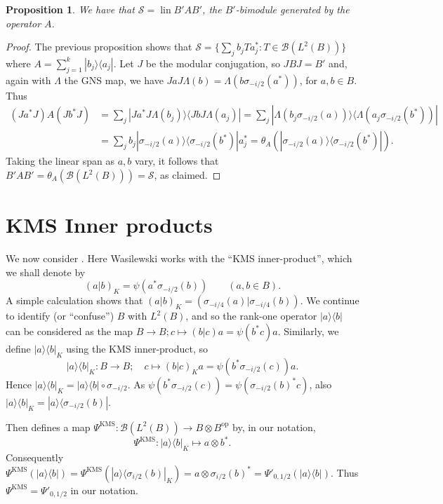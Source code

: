 \documentclass[a4paper,11pt]{article}
\theoremstyle{plain}
\newtheorem{proposition}{Proposition}[section]
\theoremstyle{remark}
\newcommand{\mc}[1]{\mathcal{#1}}
\newcommand{\lin}{\operatorname{lin}}
\newcommand{\op}{{\operatorname{op}}}
\newcommand{\KMS}{\textrm{KMS}}
\begin{document}
\begin{proposition}\label{prop:S_is_bimod_A}
We have that $\mc S = \lin B' A B'$, the $B'$-bimodule generated by the operator $A$.
\end{proposition}
\begin{proof}
The previous proposition shows that $\mc S = \{ \sum_j b_j T a_j^* : T\in\mc B(L^2(B)) \}$ where $A = \sum_{j=1}^k | b_j \rangle \langle a_j |$.  Let $J$ be the modular conjugation, so $JBJ = B'$ and, again with $\Lambda$ the GNS map, we have $JaJ \Lambda(b) = \Lambda(b \sigma_{-i/2}(a^*))$, for $a,b\in B$.  Thus
\begin{align*}
(Ja^*J) A (Jb^*J)
&= \sum_j | Ja^*J\Lambda(b_j) \rangle \langle JbJ \Lambda(a_j) |
= \sum_j | \Lambda(b_j \sigma_{-i/2}(a)) \rangle \langle \Lambda(a_j \sigma_{-i/2}(b^*)) | \\
&= \sum_j b_j |\sigma_{-i/2}(a)\rangle\langle \sigma_{-i/2}(b^*)| a_j^*
= \theta_A(|\sigma_{-i/2}(a)\rangle\langle \sigma_{-i/2}(b^*)|).
\end{align*}
Taking the linear span as $a,b$ vary, it follows that $B' A B' = \theta_A(\mc B(L^2(B))) = \mc S$, as claimed.
\end{proof}



\section{KMS Inner products}

We now consider \cite{Wasilewski_Quantum_Cayley}.  Here Wasilewski works with the ``KMS inner-product'', which we shall denote by
\begin{equation}
(a|b)_K = \psi(a^* \sigma_{-i/2}(b)) \qquad (a,b\in B).
\label{eq:KMS_defn}
\end{equation}
A simple calculation shows that $(a|b)_K = (\sigma_{-i/4}(a)|\sigma_{-i/4}(b))$.  We continue to identify (or ``confuse'') $B$ with $L^2(B)$, and so the rank-one operator $|a\rangle\langle b|$ can be considered as the map $B\to B; c \mapsto (b|c) a = \psi(b^*c) a$.  Similarly, we define $|a\rangle\langle b|_K$ using the KMS inner-product, so
\[ |a\rangle\langle b|_K \colon B \to B; \quad c \mapsto (b|c)_K a =  \psi(b^* \sigma_{-i/2}(c)) a. \]
Hence $|a\rangle\langle b|_K = |a\rangle\langle b| \circ \sigma_{-i/2}$.  As $\psi(b^* \sigma_{-i/2}(c)) = \psi(\sigma_{-i/2}(b)^* c)$, also $|a\rangle\langle b|_K = |a\rangle\langle\sigma_{-i/2}(b)|$.

Then \cite[Lemma~3.3]{Wasilewski_Quantum_Cayley} defines a map $\Psi^{\KMS} \colon \mc B(L^2(B)) \to B\otimes B^\op$ by, in our notation,
\[ \Psi^{\KMS} \colon  |a\rangle\langle b|_K  \mapsto  a \otimes b^*. \]
Consequently $\Psi^{\KMS}(|a\rangle\langle b|) = \Psi^{\KMS}(|a\rangle\langle \sigma_{i/2}(b)|_K)= a \otimes \sigma_{i/2}(b)^* = \Psi'_{0, 1/2}(|a\rangle\langle b|)$.  Thus $\Psi^{\KMS} = \Psi'_{0,1/2}$ in our notation.
\end{document}

